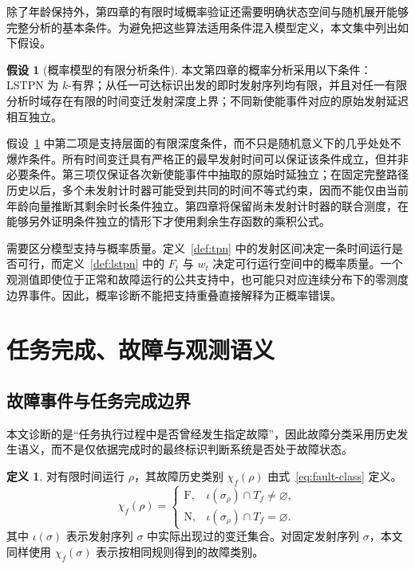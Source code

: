 \documentclass[master,fontset=ubuntu]{shnuthesis}
\theoremstyle{definition}
\newtheorem{thesisdefinition}{定义}
\newtheorem{thesisassumption}{假设}
\begin{document}
除了年龄保持外，第四章的有限时域概率验证还需要明确状态空间与随机展开能够完整分析的基本条件。为避免把这些算法适用条件混入模型定义，本文集中列出如下假设。

\begin{thesisassumption}[概率模型的有限分析条件]
\label{ass:probability-domain}
本文第四章的概率分析采用以下条件：LSTPN 为 \(k\)-有界；从任一可达标识出发的即时发射序列均有限，并且对任一有限分析时域存在有限的时间变迁发射深度上界；不同新使能事件对应的原始发射延迟相互独立。
\end{thesisassumption}

假设~\ref{ass:probability-domain} 中第二项是支持层面的有限深度条件，而不只是随机意义下的几乎处处不爆炸条件。所有时间变迁具有严格正的最早发射时间可以保证该条件成立，但并非必要条件。第三项仅保证各次新使能事件中抽取的原始时延独立；在固定完整路径历史以后，多个未发射计时器可能受到共同的时间不等式约束，因而不能仅由当前年龄向量推断其剩余时长条件独立。第四章将保留尚未发射计时器的联合测度，在能够另外证明条件独立的情形下才使用剩余生存函数的乘积公式\cite{Carnevali2009,Vicario2009,Lefebvre2023}。

需要区分模型支持与概率质量。定义~\ref{def:tpn} 中的发射区间决定一条时间运行是否可行，而定义~\ref{def:lstpn} 中的 \(F_t\) 与 \(w_t\) 决定可行运行空间中的概率质量。一个观测值即使位于正常和故障运行的公共支持中，也可能只对应连续分布下的零测度边界事件。因此，概率诊断不能把支持重叠直接解释为正概率错误。

\section{任务完成、故障与观测语义}

\subsection{故障事件与任务完成边界}

本文诊断的是“任务执行过程中是否曾经发生指定故障”，因此故障分类采用历史发生语义，而不是仅依据完成时的最终标识判断系统是否处于故障状态。

\begin{thesisdefinition}
\label{def:fault-history}
对有限时间运行 \(\rho\)，其故障历史类别 \(\chi_f(\rho)\) 由式~\eqref{eq:fault-class} 定义。
\begin{equation}
\chi_f(\rho)=
\begin{cases}
\mathrm{F}, &
\iota(\sigma_\rho)\cap T_f\neq\varnothing,\\
\mathrm{N}, &
\iota(\sigma_\rho)\cap T_f=\varnothing.
\end{cases}
\label{eq:fault-class}
\end{equation}
其中 \(\iota(\sigma)\) 表示发射序列 \(\sigma\) 中实际出现过的变迁集合。对固定发射序列 \(\sigma\)，本文同样使用 \(\chi_f(\sigma)\) 表示按相同规则得到的故障类别。
\end{thesisdefinition}
\end{document}
